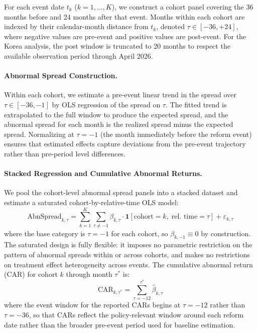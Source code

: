 For each event date $t_k$ ($k = 1, \ldots, K$), we construct a cohort panel covering the 36 months before and 24 months after that event. Months within each cohort are indexed by their calendar-month distance from $t_k$, denoted $\tau \in [-36, +24]$, where negative values are pre-event and positive values are post-event. For the Korea analysis, the post window is truncated to 20 months to respect the available observation period through April 2026.

\paragraph{Abnormal Spread Construction.} Within each cohort, we estimate a pre-event linear trend in the spread over $\tau \in [-36, -1]$ by OLS regression of the spread on $\tau$. The fitted trend is extrapolated to the full window to produce the expected spread, and the abnormal spread for each month is the realized spread minus the expected spread. Normalizing at $\tau = -1$ (the month immediately before the reform event) ensures that estimated effects capture deviations from the pre-event trajectory rather than pre-period level differences.

\paragraph{Stacked Regression and Cumulative Abnormal Returns.} We pool the cohort-level abnormal spread panels into a stacked dataset and estimate a saturated cohort-by-relative-time OLS model:
\begin{equation}
    \text{AbnSpread}_{k,\tau} = \sum_{k=1}^{K} \sum_{\tau \neq -1} \beta_{k,\tau} \cdot \mathbf{1}[\text{cohort} = k,\; \text{rel.\ time} = \tau] + \varepsilon_{k,\tau}
\end{equation}
where the base category is $\tau = -1$ for each cohort, so $\beta_{k,-1} \equiv 0$ by construction. The saturated design is fully flexible: it imposes no parametric restriction on the pattern of abnormal spreads within or across cohorts, and makes no restrictions on treatment effect heterogeneity across events. The cumulative abnormal return (CAR) for cohort $k$ through month $\tau^*$ is:
\begin{equation}
    \text{CAR}_{k,\tau^*} = \sum_{\tau=-12}^{\tau^*} \hat{\beta}_{k,\tau}
\end{equation}
where the event window for the reported CARs begins at $\tau = -12$ rather than $\tau = -36$, so that CARs reflect the policy-relevant window around each reform date rather than the broader pre-event period used for baseline estimation.

